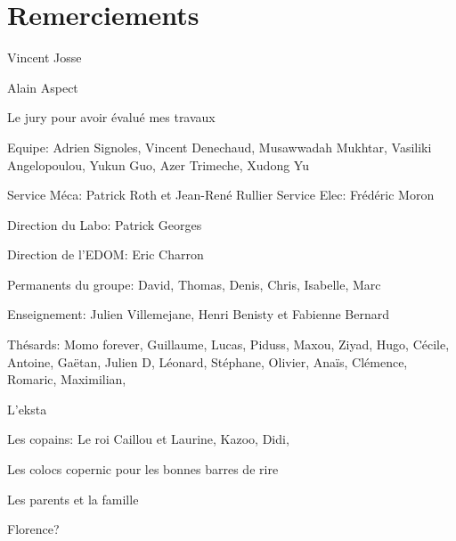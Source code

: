 \chapterimage{}
\chapter*{Remerciements}

Vincent Josse

Alain Aspect

Le jury pour avoir évalué mes travaux

Equipe: Adrien Signoles, Vincent Denechaud, Musawwadah Mukhtar, Vasiliki Angelopoulou, Yukun Guo, Azer Trimeche, Xudong Yu

Service Méca: Patrick Roth et Jean-René Rullier
Service Elec: Frédéric Moron

Direction du Labo: Patrick Georges

Direction de l'EDOM: Eric Charron

Permanents du groupe: David, Thomas, Denis, Chris, Isabelle, Marc

Enseignement: Julien Villemejane, Henri Benisty et Fabienne Bernard

Thésards: Momo forever, Guillaume, Lucas, Piduss, Maxou, Ziyad, Hugo, Cécile, Antoine, Gaëtan, Julien D, Léonard, Stéphane, Olivier, Anaïs, Clémence, Romaric, Maximilian, 

L'eksta

Les copains: Le roi Caillou et Laurine, Kazoo, Didi, 

Les colocs copernic pour les bonnes barres de rire

Les parents et la famille

Florence?


